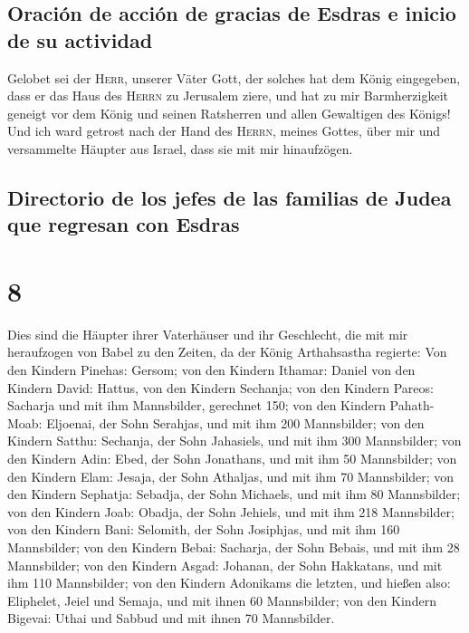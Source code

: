 \hypertarget{oraciuxf3n-de-acciuxf3n-de-gracias-de-esdras-e-inicio-de-su-actividad}{%
\subsection{Oración de acción de gracias de Esdras e inicio de su
actividad}\label{oraciuxf3n-de-acciuxf3n-de-gracias-de-esdras-e-inicio-de-su-actividad}}

 Gelobet sei der \textsc{Herr}, unserer Väter Gott, der
solches hat dem König eingegeben, dass er das Haus des \textsc{Herrn} zu
Jerusalem ziere,  und hat zu mir Barmherzigkeit geneigt
vor dem König und seinen Ratsherren und allen Gewaltigen des Königs! Und
ich ward getrost nach der Hand des \textsc{Herrn}, meines Gottes, über
mir und versammelte Häupter aus Israel, dass sie mit mir hinaufzögen.

\hypertarget{directorio-de-los-jefes-de-las-familias-de-judea-que-regresan-con-esdras}{%
\subsection{Directorio de los jefes de las familias de Judea que
regresan con
Esdras}\label{directorio-de-los-jefes-de-las-familias-de-judea-que-regresan-con-esdras}}

\hypertarget{section-7}{%
\section{8}\label{section-7}}

 Dies sind die Häupter ihrer Vaterhäuser und ihr
Geschlecht, die mit mir heraufzogen von Babel zu den Zeiten, da der
König Arthahsastha regierte:  Von den Kindern Pinehas:
Gersom; von den Kindern Ithamar: Daniel von den Kindern David: Hattus,
 von den Kindern Sechanja; von den Kindern Pareos:
Sacharja und mit ihm Mannsbilder, gerechnet 150;  von den
Kindern Pahath-Moab: Eljoenai, der Sohn Serahjas, und mit ihm 200
Mannsbilder;  von den Kindern Satthu: Sechanja, der Sohn
Jahasiels, und mit ihm 300 Mannsbilder;  von den Kindern
Adin: Ebed, der Sohn Jonathans, und mit ihm 50 Mannsbilder;
 von den Kindern Elam: Jesaja, der Sohn Athaljas, und mit
ihm 70 Mannsbilder;  von den Kindern Sephatja: Sebadja,
der Sohn Michaels, und mit ihm 80 Mannsbilder;  von den
Kindern Joab: Obadja, der Sohn Jehiels, und mit ihm 218 Mannsbilder;
 von den Kindern Bani: Selomith, der Sohn Josiphjas, und
mit ihm 160 Mannsbilder;  von den Kindern Bebai:
Sacharja, der Sohn Bebais, und mit ihm 28 Mannsbilder; 
von den Kindern Asgad: Johanan, der Sohn Hakkatans, und mit ihm 110
Mannsbilder;  von den Kindern Adonikams die letzten, und
hießen also: Eliphelet, Jeiel und Semaja, und mit ihnen 60 Mannsbilder;
 von den Kindern Bigevai: Uthai und Sabbud und mit ihnen
70 Mannsbilder.

